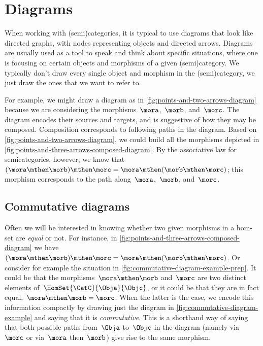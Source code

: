 
\section{Diagrams}

When working with (semi)categories, it is typical to use diagrams that look like directed graphs, with nodes representing objects and directed arrows.
Diagrams are usually used as a tool to speak and think about specific situations, where one is focusing on certain objects and morphisms of a given (semi)category.
We typically don't draw every single object and morphism in the (semi)category, we just draw the ones that we want to refer to.

\begin{marginfigure}
    \centering
    \caption{}
    \label{fig:points-and-three-arrows-diagram}
\end{marginfigure}

\begin{marginfigure}
    \centering
    \caption{}
    \label{fig:points-and-three-arrows-composed-diagram}
\end{marginfigure}

For example, we might draw a diagram as in \cref{fig:points-and-two-arrows-diagram} because we are considering the morphisms~$\mora$,~$\morb$, and~$\morc$.
The diagram encodes their sources and targets, and is suggestive of how they may be composed.
Composition corresponds to following paths in the diagram.
Based on \cref{fig:points-and-two-arrows-diagram}, we could build all the morphisms depicted in \cref{fig:points-and-three-arrows-composed-diagram}.
By the associative law for semicategories, however, we know that~$(\mora \mthen \morb) \mthen \morc = \mora \mthen (\morb \mthen \morc)$;
this morphism corresponds to the path along~$\mora$,~$\morb$, and~$\morc$.

\subsection{Commutative diagrams}

Often we will be interested in knowing whether two given morphisms in a hom-set are \emph{equal} or not.
For instance, in \cref{fig:points-and-three-arrows-composed-diagram} we have~$(\mora \mthen \morb) \mthen \morc = \mora \mthen (\morb \mthen \morc)$.
Or consider for example the situation in \cref{fig:commutative-diagram-example-prep}.
It could be that the morphisms~$\mora \mthen \morb$ and~$\morc$ are two distinct elements of~$\HomSet{\CatC}{\Obja}{\Objc}$, or it could be that they are in fact equal,~$\mora \mthen \morb = \morc$.
When the latter is the case, we encode this information compactly by drawing just the diagram in \cref{fig:commutative-diagram-example} and saying that it is \emph{commutative}.
This is a shorthand way of saying that both possible paths from~$\Obja$ to~$\Objc$ in the diagram (namely via~$\morc$ or via~$\mora$ then~$\morb$) give rise to the same morphism.

